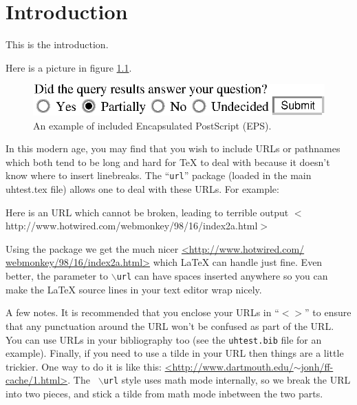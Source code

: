 \chapter{Introduction}

This is the introduction.

Here is a picture in figure \ref{fig:example-1}.

\begin{figure}[htbp]
  \centering
  \includegraphics{example-figure.eps}
  \caption{An example of included Encapsulated PostScript (EPS).}
  \label{fig:example-1}
\end{figure}

In this modern age, you may find that you wish to include URLs or pathnames
which both tend to be long and hard for TeX to deal with because it doesn't
know where to insert linebreaks. The ``{\tt url}'' package (loaded in the main
uhtest.tex file) allows one to deal with these URLs. For example:

Here is an URL which cannot be broken, leading to terrible output
$<$http://www.hotwired.com/webmonkey/98/16/index2a.html$>$

Using the package we get the much nicer \url{<http://www.hotwired.com/
webmonkey/98/16/index2a.html>} which LaTeX can handle just fine. Even better,
the parameter to {\tt $\backslash$url} can have spaces inserted anywhere so you
can make the LaTeX source lines in your text editor wrap nicely.

A few notes. It is recommended that you enclose your URLs in ``$<>$'' to ensure
that any punctuation around the URL won't be confused as part of the URL. You
can use URLs in your bibliography too (see the {\tt uhtest.bib} file for an
example). Finally, if you need to use a tilde in your URL then things are a
little trickier. One way to do it is like this:
\url{<http://www.dartmouth.edu/}$\sim$\url{jonh/ff-cache/1.html>}. The {\tt
$\backslash$url} style uses math mode internally, so we break the URL into two
pieces, and stick a tilde from math mode inbetween the two parts.


